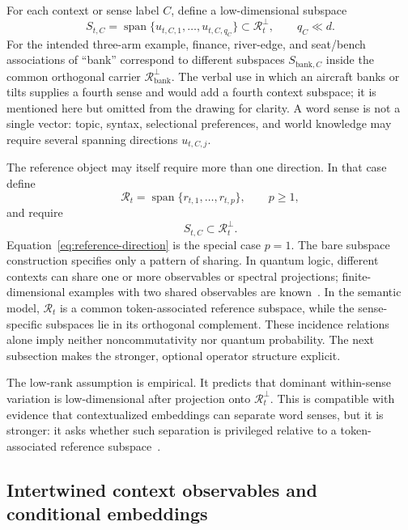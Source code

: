 \documentclass[
  aps,
  reprint,
  superscriptaddress,
  floatfix,
  nofootinbib,
  longbibliography
]{revtex4-2}
\DeclareMathOperator{\spanop}{span}
\begin{document}
For each context or sense label $C$, define a low-dimensional subspace
%
\begin{equation}
\label{eq:sense-subspace}
S_{t,C}=\spanop\{u_{t,C,1},\dots,u_{t,C,q_C}\}
\subset\mathcal R_t^\perp,
\qquad q_C\ll d .
\end{equation}
%
For the intended three-arm example, finance, river-edge, and seat/bench
associations of ``bank'' correspond to different subspaces
$S_{\mathrm{bank},C}$ inside the common orthogonal carrier
$\mathcal R_{\mathrm{bank}}^\perp$.  The verbal use in which an aircraft
banks or tilts supplies a fourth sense and would add a fourth context
subspace; it is mentioned here but omitted from the drawing for clarity.  A
word sense is not a single vector: topic, syntax, selectional preferences,
and world knowledge may require several spanning directions $u_{t,C,j}$.

The reference object may itself require more than one direction. In that
case define
%
\begin{equation}
\label{eq:reference-subspace}
\mathcal R_t=
\spanop\{r_{t,1},\dots,r_{t,p}\},
\qquad p\ge1,
\end{equation}
%
and require
%
\begin{equation}
\label{eq:multi-sense-subspace}
S_{t,C}\subset\mathcal R_t^\perp .
\end{equation}
%
Equation~\eqref{eq:reference-direction} is the special case $p=1$.
The bare subspace construction specifies only a pattern of sharing. In
quantum logic, different contexts can share one or more observables or
spectral projections; finite-dimensional examples with two shared
observables are known~\cite{svozil:040102}. In the semantic model,
$\mathcal R_t$ is a common token-associated reference subspace, while the
sense-specific subspaces lie in its orthogonal complement. These incidence
relations alone imply neither noncommutativity nor quantum probability. The
next subsection makes the stronger, optional operator structure explicit.

The low-rank assumption is empirical. It predicts that dominant
within-sense variation is low-dimensional after projection onto
$\mathcal R_t^\perp$. This is compatible with evidence that contextualized
embeddings can separate word senses, but it is stronger: it asks whether
such separation is privileged relative to a token-associated reference
subspace~\cite{wiedemann2019does,scarlini2020ares}.

\subsection{Intertwined context observables and conditional embeddings}
\label{sec:observables}
\end{document}
